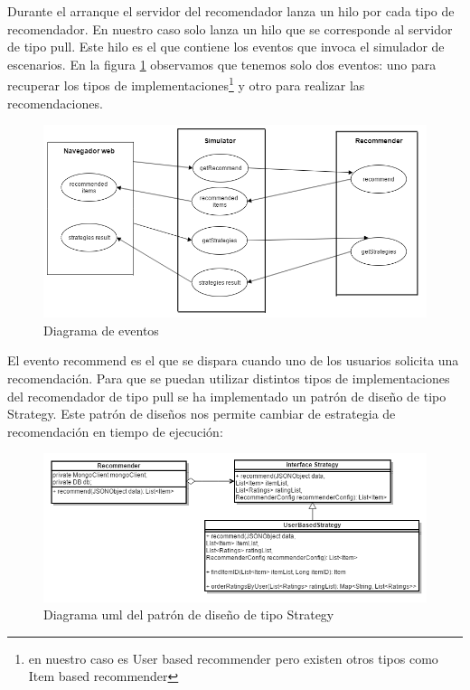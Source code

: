 Durante el arranque el servidor del recomendador lanza un hilo por cada tipo de recomendador. En nuestro caso solo lanza un hilo que se corresponde al servidor de tipo pull. Este hilo es el que contiene los eventos que invoca el simulador de escenarios. En la figura \ref{diagramaEventos} observamos que tenemos solo dos eventos: uno para recuperar los tipos de implementaciones\footnote{en nuestro caso es User based recommender pero existen otros tipos como Item based recommender} y otro para realizar las recomendaciones.

\begin{figure}[H]
\centering\includegraphics[scale=0.6]{imagenes/diagrama-de-eventos.png}
\caption{Diagrama de eventos}
\label{diagramaEventos}
\end{figure}

El evento recommend es el que se dispara cuando uno de los usuarios solicita una recomendación. Para que se puedan utilizar distintos tipos de implementaciones del recomendador de tipo pull se ha implementado un patrón de diseño de tipo Strategy. Este patrón de diseños nos permite cambiar de estrategia de recomendación en tiempo de ejecución:

\begin{figure}[H]
\includegraphics[scale=0.7]{imagenes/uml.png}
\caption{Diagrama uml del patrón de diseño de tipo Strategy}
\label{diagramaUMLStrategy}
\end{figure}

